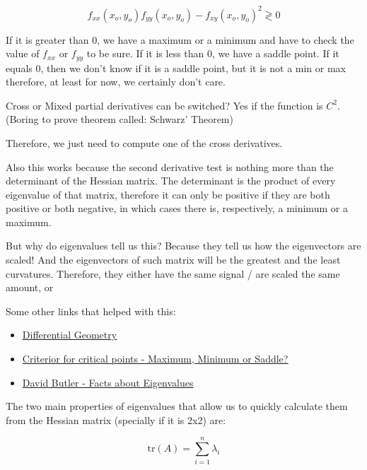 \begin{equation}
    f_{xx}(x_o, y_o) f_{yy}(x_o, y_o) - f_{xy}(x_o, y_o)^2 \gtrless 0
\end{equation}

If it is greater than 0, we have a maximum or a minimum and have to check the value of $f_{xx}$ or $f_{yy}$ to be sure. If it is less than 0, we have a saddle point. If it equals 0, then we don't know if it is a saddle point, but it is not a min or max therefore, at least for now, we certainly don't care.

Cross or Mixed partial derivatives can be switched? Yes if the function is $C^2$. 
(Boring to prove theorem called: Schwarz' Theorem)

Therefore, we just need to compute one of the cross derivatives.


Also this works because the second derivative test is nothing more than the determinant of the Hessian matrix. The determinant is the product of every eigenvalue of that matrix, therefore it can only be positive if they are both positive or both negative, in which cases there is, respectively, a minimum or a maximum. 

But why do eigenvalues tell us this? Because they tell us how the eigenvectors are scaled! And the eigenvectors of such matrix will be the greatest and the least curvatures. Therefore, they either have the same signal / are scaled the same amount, or 



Some other links that helped with this:
\begin{itemize}
    \item \href{http://homepages.inf.ed.ac.uk/rbf/CVonline/LOCAL_COPIES/MORSE/diffgeom.pdf}{\ul{Differential Geometry}}
    \item \href{http://math.mit.edu/classes/18.013A/HTML/chapter11/section02.html}{\ul{Criterior for critical points - Maximum, Minimum or Saddle?}}
    \item \href{https://www.adelaide.edu.au/mathslearning/play/seminars/evalue-magic-tricks-handout.pdf}{David Butler - Facts about Eigenvalues}
\end{itemize}


The two main properties of eigenvalues that allow us to quickly calculate them from the Hessian matrix (specially if it is 2x2) are:

\begin{equation}
    \text{tr}(A) = \sum^n_{i = 1} \lambda_i    
\end{equation}

